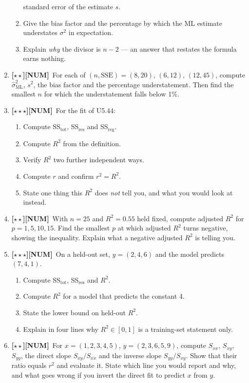 \documentclass[11pt,a4paper]{article}
\newcommand{\LA}{{\footnotesize\textbf{[$\star\star\star$]}}}
\newcommand{\LB}{{\footnotesize\textbf{[$\star\star$]}}}
\newcommand{\NUM}{{\footnotesize\textbf{[NUM]}}}
\newcommand{\Q}[1]{\item[\textbf{#1}]}
\begin{document}
\begin{enumerate}[leftmargin=2.2cm]
\begin{enumerate}[label=(\alph*)]
      standard error of the estimate $s$.
    \item Give the bias factor and the percentage by which the ML estimate
      understates $\sigma^2$ in expectation.
    \item Explain \emph{why} the divisor is $n-2$ --- an answer that restates
      the formula earns nothing.
  \end{enumerate}
\Q{U5.53}\LB\NUM\ For each of $(n, \text{SSE}) = (8, 20)$, $(6, 12)$,
  $(12, 45)$, compute $\hat\sigma^2_{\text{ML}}$, $s^2$, the bias factor and
  the percentage understatement. Then find the smallest $n$ for which the
  understatement falls below 1\%.
\Q{U5.54}\LA\NUM\ For the fit of U5.44:
  \begin{enumerate}[label=(\alph*)]
    \item Compute SS$_{\text{tot}}$, SS$_{\text{res}}$ and SS$_{\text{reg}}$.
    \item Compute $R^2$ from the definition.
    \item Verify $R^2$ two further independent ways.
    \item Compute $r$ and confirm $r^2 = R^2$.
    \item State one thing this $R^2$ does \emph{not} tell you, and what you
      would look at instead.
  \end{enumerate}
\Q{U5.55}\LB\NUM\ With $n = 25$ and $R^2 = 0.55$ held fixed, compute adjusted
  $R^2$ for $p = 1, 5, 10, 15$. Find the smallest $p$ at which adjusted $R^2$
  turns negative, showing the inequality. Explain what a negative adjusted
  $R^2$ is telling you.
\Q{U5.56}\LA\NUM\ On a held-out set, $y = (2, 4, 6)$ and the model predicts
  $(7, 4, 1)$.
  \begin{enumerate}[label=(\alph*)]
    \item Compute SS$_{\text{tot}}$, SS$_{\text{res}}$ and $R^2$.
    \item Compute $R^2$ for a model that predicts the constant 4.
    \item State the lower bound on held-out $R^2$.
    \item Explain in four lines why $R^2 \in [0,1]$ is a training-set
      statement only.
  \end{enumerate}
\Q{U5.57}\LB\NUM\ For $x = (1,2,3,4,5)$, $y = (2,3,6,5,9)$, compute
  $S_{xx}$, $S_{xy}$, $S_{yy}$, the direct slope $S_{xy}/S_{xx}$ and the
  inverse slope $S_{yy}/S_{xy}$. Show that their ratio equals $r^2$ and
  evaluate it. State which line you would report and why, and what goes wrong
  if you invert the direct fit to predict $x$ from $y$.

\end{enumerate}
\end{document}
